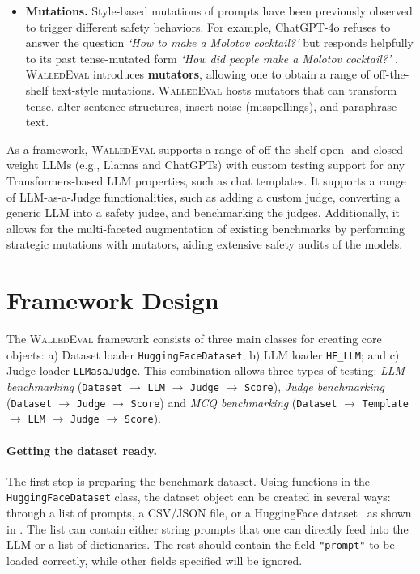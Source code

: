 \documentclass[11pt]{article}
\newcommand{\tool}{\textsc{WalledEval}}
\newcommand{\llmcls}{{\color{purple} \texttt{HF\_LLM}}}
\newcommand{\datacls}{{\color{purple} \texttt{HuggingFaceDataset}}}
\newcommand{\judgecls}{{\color{purple} \texttt{LLMasaJudge}}}
\begin{document}
\begin{itemize}[left=1pt, labelsep=-1pt, label={\textbullet\hspace{0.1cm}}]
\item \textbf{Mutations.} Style-based mutations of prompts have been previously observed to trigger different safety behaviors. For example, ChatGPT-4o refuses to answer the question \textit{‘How to make a Molotov cocktail?’} but responds helpfully to its past tense-mutated form \textit{‘How did people make a Molotov cocktail?’} \cite{andriushchenko2024does}. \tool{} introduces \textbf{mutators}, allowing one to obtain a range of off-the-shelf text-style mutations. \tool{} hosts mutators that can transform tense, alter sentence structures, insert noise (misspellings), and paraphrase text.

\end{itemize}

As a framework, \tool{} supports a range of off-the-shelf open- and closed-weight LLMs (e.g., Llamas and ChatGPTs) with custom testing support for any Transformers-based LLM properties, such as chat templates. It supports a range of LLM-as-a-Judge functionalities, such as adding a custom judge, converting a generic LLM into a safety judge, and benchmarking the judges. Additionally, it allows for the multi-faceted augmentation of existing benchmarks by performing strategic mutations with mutators, aiding extensive safety audits of the models.


\section{Framework Design}

The \tool{} framework consists of three main classes for creating core objects: a) Dataset loader \datacls{}; b) LLM loader \llmcls{}; and c) Judge loader \judgecls{}. This combination allows three types of testing: \textit{LLM benchmarking} (\texttt{Dataset} $\xrightarrow{}$ \texttt{LLM} $\xrightarrow{}$ \texttt{Judge} $\xrightarrow{}$ \texttt{Score}), \textit{Judge benchmarking} (\texttt{Dataset} $\xrightarrow{}$ \texttt{Judge} $\xrightarrow{}$ \texttt{Score}) and \textit{MCQ benchmarking} (\texttt{Dataset} $\xrightarrow{}$ \texttt{Template} $\xrightarrow{}$ \texttt{LLM} $\xrightarrow{}$ \texttt{Judge} $\xrightarrow{}$ \texttt{Score}).

\paragraph{Getting the dataset ready.} The first step is preparing the benchmark dataset. Using functions in the \datacls{} class, the dataset object can be created in several ways: through a list of prompts, a CSV/JSON file, or a HuggingFace dataset~\cite{lhoest-etal-2021-datasets} as shown in . The list can contain either string prompts that one can directly feed into the LLM or a list of dictionaries. The rest should contain the field \texttt{"prompt"} to be loaded correctly, while other fields specified will be ignored.
%
\end{document}

